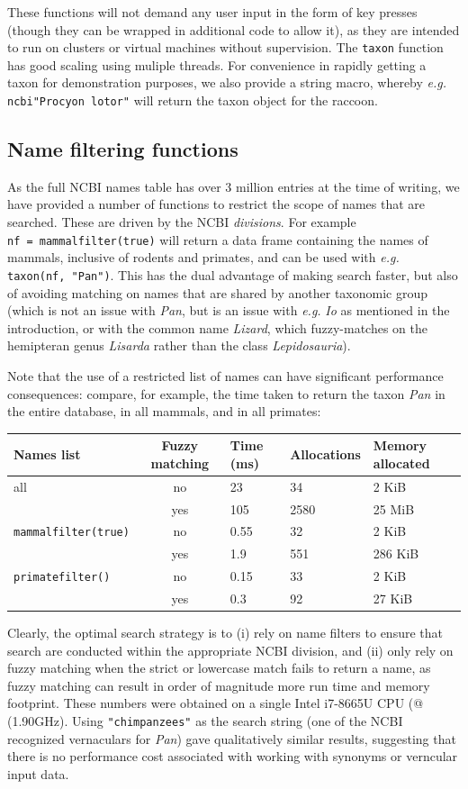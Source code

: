\documentclass[10pt,oneside]{article}
\begin{document}
These functions will not demand any user input in the form of key
presses (though they can be wrapped in additional code to allow it), as
they are intended to run on clusters or virtual machines without
supervision. The \texttt{taxon} function has good scaling using muliple
threads. For convenience in rapidly getting a taxon for demonstration
purposes, we also provide a string macro, whereby \emph{e.g.}
\texttt{ncbi"Procyon\ lotor"} will return the taxon object for the
raccoon.

\hypertarget{name-filtering-functions}{%
\subsection{Name filtering functions}\label{name-filtering-functions}}

As the full NCBI names table has over 3 million entries at the time of
writing, we have provided a number of functions to restrict the scope of
names that are searched. These are driven by the NCBI \emph{divisions}.
For example \texttt{nf\ =\ mammalfilter(true)} will return a data frame
containing the names of mammals, inclusive of rodents and primates, and
can be used with \emph{e.g.} \texttt{taxon(nf,\ "Pan")}. This has the
dual advantage of making search faster, but also of avoiding matching on
names that are shared by another taxonomic group (which is not an issue
with \emph{Pan}, but is an issue with \emph{e.g.} \emph{Io} as mentioned
in the introduction, or with the common name \emph{Lizard}, which
fuzzy-matches on the hemipteran genus \emph{Lisarda} rather than the
class \emph{Lepidosauria}).

Note that the use of a restricted list of names can have significant
performance consequences: compare, for example, the time taken to return
the taxon \emph{Pan} in the entire database, in all mammals, and in all
primates:

\begin{longtable}[]{@{}lclll@{}}
\toprule
Names list & Fuzzy matching & Time (ms) & Allocations & Memory
allocated\tabularnewline
\midrule
\endhead
all & no & 23 & 34 & 2 KiB\tabularnewline
& yes & 105 & 2580 & 25 MiB\tabularnewline
\texttt{mammalfilter(true)} & no & 0.55 & 32 & 2 KiB\tabularnewline
& yes & 1.9 & 551 & 286 KiB\tabularnewline
\texttt{primatefilter()} & no & 0.15 & 33 & 2 KiB\tabularnewline
& yes & 0.3 & 92 & 27 KiB\tabularnewline
\bottomrule
\end{longtable}

Clearly, the optimal search strategy is to (i) rely on name filters to
ensure that search are conducted within the appropriate NCBI division,
and (ii) only rely on fuzzy matching when the strict or lowercase match
fails to return a name, as fuzzy matching can result in order of
magnitude more run time and memory footprint. These numbers were
obtained on a single Intel i7-8665U CPU (@ (1.90GHz). Using
\texttt{"chimpanzees"} as the search string (one of the NCBI recognized
vernaculars for \emph{Pan}) gave qualitatively similar results,
suggesting that there is no performance cost associated with working
with synonyms or verncular input data.
\end{document}
